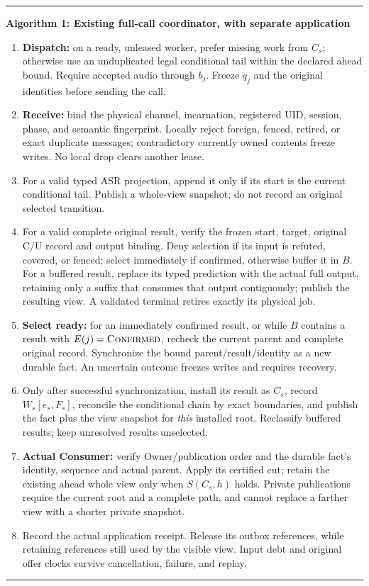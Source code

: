 \documentclass[10pt]{article}
\newcommand{\conf}{\textsc{Confirmed}}
\begin{document}
\begin{minipage}{\linewidth}
\hrule\smallskip
\textbf{Algorithm 1: Existing full-call coordinator, with separate application}
\begin{enumerate}\setlength{\itemsep}{2pt}
\item \textbf{Dispatch:} on a ready, unleased worker, prefer missing work
from $C_s$; otherwise use an unduplicated legal conditional tail within the
declared ahead bound. Require accepted audio through $b_j$. Freeze $q_j$
and the original identities before sending the call.
\item \textbf{Receive:} bind the physical channel, incarnation, registered
UID, session, phase, and semantic fingerprint. Locally reject foreign,
fenced, retired, or exact duplicate messages; contradictory currently owned
contents freeze writes. No local drop clears another lease.
\item For a valid typed ASR projection, append it only if its start is the
current conditional tail. Publish a whole-view snapshot; do not record an
original selected transition.
\item For a valid complete original result, verify the frozen start,
target, original C/U record and output binding. Deny selection if its input
is refuted, covered, or fenced; select immediately if confirmed, otherwise
buffer it in $B$. For a buffered result, replace its typed prediction with
the actual full output, retaining only a suffix that consumes that output
contiguously; publish the resulting view. A validated terminal retires
exactly its physical job.
\item \textbf{Select ready:} for an immediately confirmed result, or while
$B$ contains a result with $E(j)=\conf$,
recheck the current parent and complete original record. Synchronize the
bound parent/result/identity as a new durable fact. An uncertain outcome
freezes writes and requires recovery.
\item Only after successful synchronization, install its result as $C_s$,
record $W_s[e_s,F_s]$, reconcile the conditional chain by exact boundaries,
and publish the fact plus the view snapshot for \emph{this} installed root.
Reclassify buffered results; keep unresolved results unselected.
\item \textbf{Actual Consumer:} verify Owner/publication order and the
durable fact's identity, sequence and actual parent. Apply its certified
cut; retain the existing ahead whole view only when $S(C_s,h)$ holds.
Private publications require the current root and a complete path, and
cannot replace a farther view with a shorter private snapshot.
\item Record the actual application receipt. Release its outbox references,
while retaining references still used by the visible view. Input debt and
original offer clocks survive cancellation, failure, and replay.
\end{enumerate}
\smallskip\hrule
\end{minipage}
\end{document}
